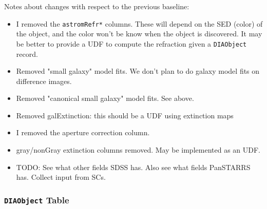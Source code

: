 \documentclass[12pt]{article}
\newcommand{\code}[1]{\texttt{#1}}
\newcommand{\DIAObject}{\code{DIAObject}\xspace}
\begin{document}
\begin{changelog}
Notes about changes with respect to the previous baseline:
\begin{itemize}
\item I removed the \texttt{astromRefr*} columns. These will depend on the SED
      (color) of the object, and the color won't be know when the object is
      discovered. It may be better to provide a UDF to compute the refraction
      given a \DIAObject record.
\item Removed "small galaxy" model fits. We don't plan to do galaxy model fits
      on difference images.
\item Removed "canonical small galaxy" model fits. See above.
\item Removed galExtinction: this should be a UDF using extinction maps
\item I removed the aperture correction column.
\item gray/nonGray extinction columns removed. May be implemented as an UDF.
\item TODO: See what other fields SDSS has. Also see what fields PanSTARRS
      has. Collect input from SCs.
\end{itemize}
\end{changelog}

\subsubsection{\DIAObject Table}
\end{document}
